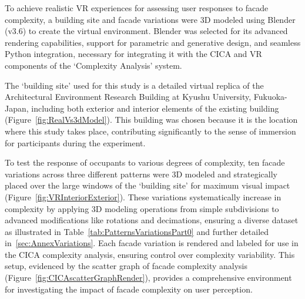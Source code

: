 %    



To achieve realistic VR experiences for assessing user responses to facade complexity, a building site and facade variations were 3D modeled using Blender (v3.6) to create the virtual environment.
Blender was selected for its advanced rendering capabilities, support for parametric and generative design, and seamless Python integration, necessary for integrating it with the CICA and VR components of the `Complexity Analysis' system.

The `building site' used for this study is a detailed virtual replica of the Architectural Environment Research Building at Kyushu University, Fukuoka-Japan, including both exterior and interior elements of the existing building (Figure~\ref{fig:RealVs3dModel}). This building was chosen because it is the location where this study takes place, contributing significantly to the sense of immersion for participants during the experiment.

To test the response of occupants to various degrees of complexity, ten facade variations across three different patterns were 3D modeled and strategically placed over the large windows of the `building site' for maximum visual impact (Figure~\ref{fig:VRInteriorExterior}). These variations systematically increase in complexity by applying 3D modeling operations from simple subdivisions to advanced modifications like rotations and decimations, ensuring a diverse dataset as illustrated in Table~\ref{tab:PatternsVariationsPart0} and further detailed in~\ref{sec:AnnexVariations}.
Each facade variation is rendered and labeled for use in the CICA complexity analysis, ensuring control over complexity variability.
This setup, evidenced by the scatter graph of facade complexity analysis (Figure~\ref{fig:CICAscatterGraphRender}), provides a comprehensive environment for investigating the impact of facade complexity on user perception.


